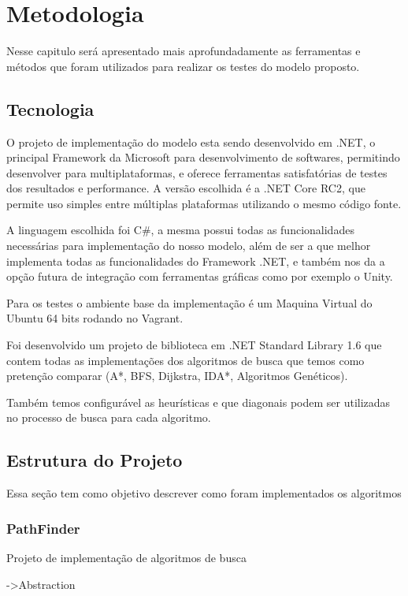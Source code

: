 \chapter[Metodologia]{Metodologia}

Nesse capitulo será apresentado mais aprofundadamente as ferramentas e métodos que foram utilizados para realizar os testes do modelo proposto.

\section{Tecnologia}

O projeto de implementação do modelo esta sendo desenvolvido em .NET, o principal Framework da Microsoft para desenvolvimento de softwares, permitindo desenvolver para multiplataformas, e oferece ferramentas satisfatórias de testes dos resultados e performance. A versão escolhida é a .NET Core RC2, que permite uso simples entre múltiplas plataformas utilizando o mesmo código fonte.

A linguagem escolhida foi C\#, a mesma possui todas as funcionalidades necessárias para implementação do nosso modelo, além de ser a que melhor implementa todas as funcionalidades do Framework .NET, e também nos da a opção futura de integração com ferramentas gráficas como por exemplo o Unity.

Para os testes o ambiente base da implementação é um Maquina Virtual do Ubuntu 64 bits rodando no Vagrant.

Foi desenvolvido um projeto de biblioteca em .NET Standard Library 1.6 que contem todas as implementações dos algoritmos de busca que temos como pretenção 
comparar (A*, BFS, Dijkstra, IDA*, Algoritmos Genéticos).

Também temos configurável as heurísticas e que diagonais podem ser utilizadas no processo de busca para cada algoritmo.

\section{Estrutura do Projeto}
Essa seção tem como objetivo descrever como foram implementados os algoritmos 

\subsection {PathFinder}

Projeto de implementação de algoritmos de busca

->Abstraction

